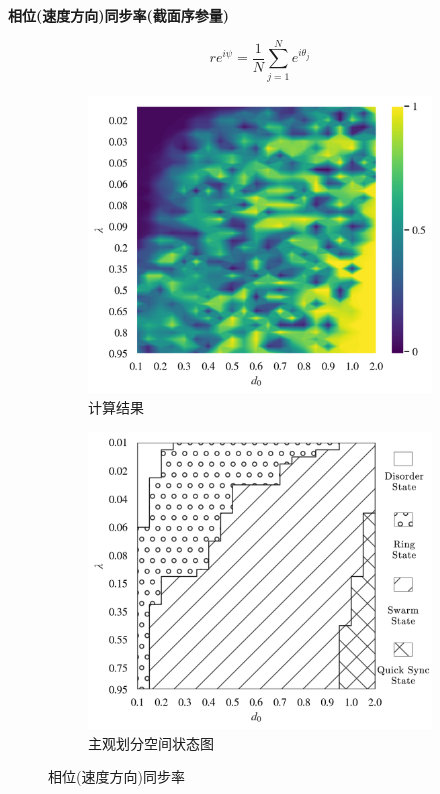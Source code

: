 \documentclass{article}
\begin{document}
\noindent\textbf{相位(速度方向)同步率(截面序参量)}

$$
r e^{i\psi}=\frac{1}{N}\sum_{j=1}^{N}{e^{i\theta _j}}
$$

\begin{figure}[H]
	\centering
	\begin{subfigure}[b]{0.49\textwidth}
		\includegraphics[width=\textwidth]{./figs/phaseSyncOp.png}
		\vspace{-1cm}
		\caption{计算结果}
	\end{subfigure}
	\begin{subfigure}[b]{0.49\textwidth}
		\includegraphics[width=\textwidth]{./figs/subjectiveOp3.png}
		\vspace{-1cm}
		\caption{主观划分空间状态图}
	\end{subfigure}
	\vspace{-0.5cm}
	\caption{相位(速度方向)同步率}
	\label{fig:fig234c.1}
\end{figure}
\end{document}
